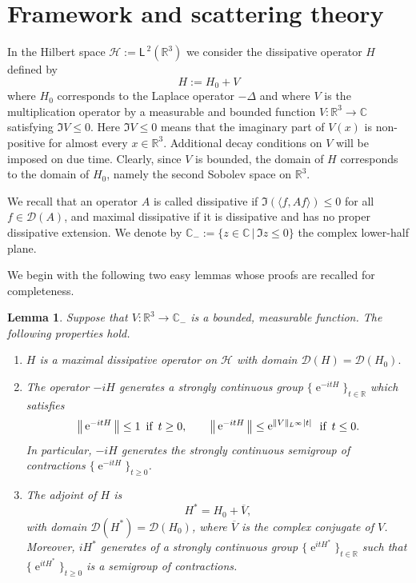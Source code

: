 \documentclass{article}
\def\C{\mathbb C}
\def\H{\mathcal H}
\def\R{\mathbb R}
\def\dom{\mathcal D}
\def\ltwo{\mathsf{L}^{\:\!\!2}}
\def\e{\mathop{\mathrm{e}}\nolimits}
\newtheorem{Lemma}[Theorem]{Lemma}
\begin{document}
\section{Framework and scattering theory}\label{sec_frame}
\setcounter{equation}{0}

In the Hilbert space $\H:=\ltwo(\R^3)$ we consider the dissipative operator $H$ defined by
\begin{equation*}
H:= H_0 + V
\end{equation*}
where $H_0$ corresponds to the Laplace operator $-\Delta$ and where $V$ is the multiplication operator by a measurable and bounded function  $V:\R^3\to \C$ satisfying $\Im V \leq 0$. Here $\Im V\leq 0$ means that the imaginary part of $V(x)$ is non-positive for almost every $x\in \R^3$.
Additional decay conditions on $V$ will be imposed on due time.
Clearly, since $V$ is bounded, the domain of $H$ corresponds to the domain of $H_0$, namely the 
second Sobolev space on $\R^3$. 

We recall that an operator $A$ is called dissipative if $\Im (\langle f , A f \rangle)\le 0$ for all $f\in\dom(A)$, and maximal dissipative if it is dissipative and has no proper dissipative extension. We denote by $\C_-:=\{z\in\C\, | \, \Im z\le 0\}$ the complex lower-half plane.

We begin with the following two easy lemmas whose proofs are recalled for completeness. 
 
\begin{Lemma}\label{lm:first}
Suppose that $V:\R^3\to \C_-$ is a bounded, measurable function. The following properties hold.
\begin{enumerate}[label=(\roman*)]
\item $H$ is a maximal dissipative operator on $\H$ with domain
$
\dom( H ) = \dom( H_0 ) .
$
\item The operator $-i H$ generates a strongly continuous group $\{ \e^{-itH} \}_{ t \in \R}$ which satisfies
\begin{equation*}
\big \|\e^{-itH}\big\| \le 1 \, \hbox{ if } \,  t \ge 0 , \qquad \big\|\e^{-itH}\big\| \le \e^{\|V\|_{L^\infty}|t|} \, \hbox{ if } \, t \le 0 .
\end{equation*}
In particular, $-i H$ generates the strongly continuous semigroup of contractions $\{ \e^{-itH} \}_{ t \ge 0 }$.
\item The adjoint of $H$ is
\begin{equation*}
H^* = H_0 + \overline{V},
\end{equation*}
with domain $\dom( H^* ) = \dom( H_0 )$, where $\overline{V}$ is the complex conjugate of $V$. Moreover, $i H^*$ generates of a strongly continuous group $\{ \e^{itH^*} \}_{t \in \R}$ such that $\{ \e^{itH^*} \}_{t \ge 0}$ is a semigroup of contractions.
\end{enumerate}
\end{Lemma}
\end{document}
